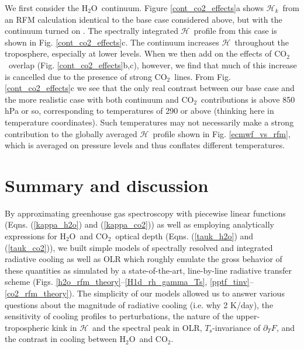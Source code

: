 \documentclass{ametsoc}
\newcommand{\eqnref}[1]{(\ref{#1})}
\newcommand{\ppt}{\ensuremath{\partial_T}}
\newcommand{\Ts}{\ensuremath{T_\mathrm{s}}}
\newcommand{\cotwo}{\ensuremath{\mathrm{CO_2}}}
\newcommand{\htwo}{\ensuremath{\mathrm{H_2O}}}
\newcommand{\ch}{\ensuremath{\mathcal{H}}}
\newcommand{\chk}{\ensuremath{\ch_k}}
\begin{document}
We first consider the \htwo\ continuum. Figure \ref{cont_co2_effects}a shows \chk\ from an RFM calculation identical to the base case considered above, but with the continuum turned on \citep[RFM contains a hard-coded version of the MT\_CKD continuum,][]{mlawer2012}. The spectrally integrated \ch\ profile from this case is shown in Fig. \ref{cont_co2_effects}c. The continuum increases \ch\ throughout the troposphere, especially at lower levels. When we then add on the effects of \cotwo\ overlap (Fig. \ref{cont_co2_effects}b,c), however, we find that much of this increase is cancelled due to the presence of strong \cotwo\ lines. From Fig. \ref{cont_co2_effects}c we see that  the only real contrast between our base case and the more realistic case with both continuum and \cotwo\ contributions is above 850 hPa or so, corresponding to temperatures of 290 or above (thinking here in temperature coordinates). Such temperatures  may not necessarily make a strong contribution to the globally averaged \ch\ profile shown in Fig. \ref{ecmwf_vs_rfm}, which is averaged on pressure levels and thus conflates different temperatures.

\section{Summary and discussion} \label{sec_summary}
By approximating greenhouse gas spectroscopy with piecewise linear functions (Eqns. \eqnref{kappa_h2o} and \eqnref{kappa_co2}) as well as employing analytically expressions for \htwo\ and \cotwo\ optical depth (Eqns. \eqnref{tauk_h2o} and \eqnref{tauk_co2}), we built simple models of spectrally resolved and integrated radiative cooling as well as OLR which roughly emulate the gross behavior of these quantities as simulated by a state-of-the-art, line-by-line radiative transfer scheme (Figs. \ref{h2o_rfm_theory}--\ref{H1d_rh_gamma_Ts}, \ref{pptf_tinv}--\ref{co2_rfm_theory}). The simplicity of our models allowed us to answer various questions about the magnitude of radiative cooling (i.e. why 2 K/day), the sensitivity of cooling profiles to perturbations, the nature of the upper-tropospheric kink in \ch\ and the  spectral peak in OLR, \Ts-invariance of $\ppt F$, and the contrast in cooling between \htwo\ and \cotwo.
\end{document}
